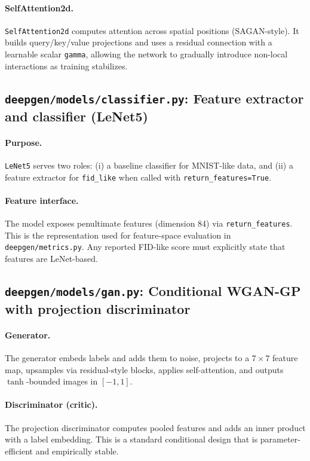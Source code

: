 \paragraph{SelfAttention2d.}
\texttt{SelfAttention2d} computes attention across spatial positions (SAGAN-style). It builds query/key/value projections and uses a residual connection with a learnable scalar \texttt{gamma}, allowing the network to gradually introduce non-local interactions as training stabilizes.

\subsection{\texttt{deepgen/models/classifier.py}: Feature extractor and classifier (LeNet5)}
\paragraph{Purpose.}
\texttt{LeNet5} serves two roles:
(i) a baseline classifier for MNIST-like data, and
(ii) a feature extractor for \texttt{fid\_like} when called with \texttt{return\_features=True}.

\paragraph{Feature interface.}
The model exposes penultimate features (dimension 84) via \texttt{return\_features}. This is the representation used for feature-space evaluation in \texttt{deepgen/metrics.py}. Any reported FID-like score must explicitly state that features are LeNet-based.

\subsection{\texttt{deepgen/models/gan.py}: Conditional WGAN-GP with projection discriminator}
\paragraph{Generator.}
The generator embeds labels and adds them to noise, projects to a $7\times 7$ feature map, upsamples via residual-style blocks, applies self-attention, and outputs $\tanh$-bounded images in $[-1,1]$.

\paragraph{Discriminator (critic).}
The projection discriminator computes pooled features and adds an inner product with a label embedding. This is a standard conditional design that is parameter-efficient and empirically stable.

